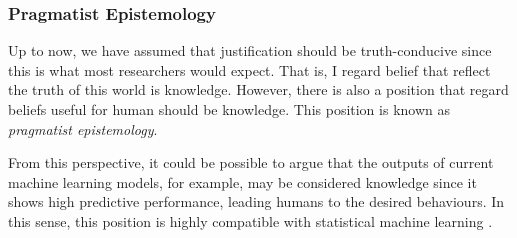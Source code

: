 \documentclass{article}
\begin{document}
 




\subsubsection{Pragmatist Epistemology}
Up to now, we have assumed that justification should be truth-conducive since this is what most researchers would expect. That is, I regard belief that reflect the truth of this world is knowledge. However, there is also a position that regard beliefs useful for human should be knowledge. This position is known as \textit{pragmatist epistemology}. 

From this perspective, it could be possible to argue that the outputs of current machine learning models, for example, may be considered knowledge since it shows high predictive performance, leading humans to the desired behaviours. In this sense, this position is highly compatible with statistical machine learning \cite{otsuka2022thinking}.
\end{document}

